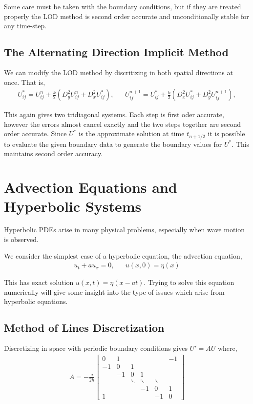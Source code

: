 \documentclass[12pt]{article}
\begin{document}
Some care must be taken with the boundary conditions, but if they are treated properly the LOD method is second order accurate and unconditionally stable for any time-step.

\subsection{The Alternating Direction Implicit Method}

We can modify the LOD method by discritizing in both spatial directions at once. That is,
\begin{align*}
    U_{ij}^* = U_{ij}^n + \frac{k}{2} \left( D_y^2 U_{ij}^n + D_x^2 U_{ij}^* \right),
    &&U_{ij}^{n+1} = U_{ij}^* + \frac{k}{2} \left( D_x^2 U_{ij}^* + D_y^2 U_{ij}^{n+1} \right),
\end{align*}

This again gives two tridiagonal systems. Each step is first oder accurate, however the errors almost cancel exactly and the two steps together are second order accurate. Since \( U^* \) is the approximate solution at time \( t_{n+1/2} \) it is possible to evaluate the given boundary data to generate the boundary values for \( U^* \). This maintains second order accuracy.



\section{Advection Equations and Hyperbolic Systems}

Hyperbolic PDEs arise in many physical problems, especially when wave motion is observed. 

We consider the simplest case of a hyperbolic equation, the advection equation,
\begin{align*}
    u_t +a u_x = 0, && u(x,0) = \eta(x)
\end{align*}

This has exact solution \( u(x,t) = \eta(x-at) \). Trying to solve this equation numerically will give some insight into the type of issues which arise from hyperbolic equations.

\subsection{Method of Lines Discretization}
Discretizing in space with periodic boundary conditions gives \( U'=AU \) where,
\begin{align*}
    A = -\frac{a}{2h} 
    \left[\begin{array}{cccccc}
        0 & 1 & & & & -1 \\
        -1 & 0 & 1\\
        &-1 & 0 & 1\\
        & &\ddots &\ddots & \ddots \\
        & & & -1 & 0 & 1 \\
        1 & & & & -1 & 0
    \end{array}\right]
\end{align*}
\end{document}
